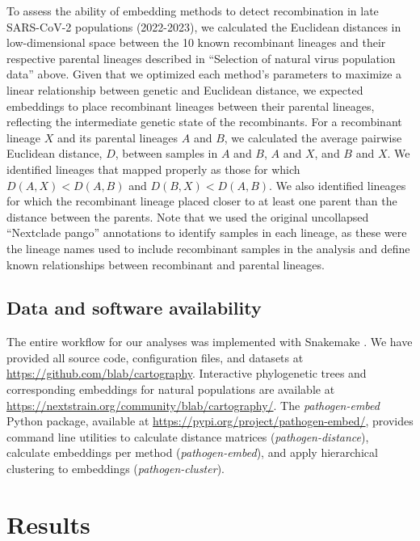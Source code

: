 \documentclass[10pt,letterpaper]{article}
\begin{document}
To assess the ability of embedding methods to detect recombination in late SARS-CoV-2 populations (2022-2023), we calculated the Euclidean distances in low-dimensional space between the 10 known recombinant lineages and their respective parental lineages described in ``Selection of natural virus population data'' above.
Given that we optimized each method's parameters to maximize a linear relationship between genetic and Euclidean distance, we expected embeddings to place recombinant lineages between their parental lineages, reflecting the intermediate genetic state of the recombinants.
For a recombinant lineage $X$ and its parental lineages $A$ and $B$, we calculated the average pairwise Euclidean distance, $D$, between samples in $A$ and $B$, $A$ and $X$, and $B$ and $X$.
We identified lineages that mapped properly as those for which $D(A, X) < D(A, B)$ and $D(B, X) < D(A, B)$.
We also identified lineages for which the recombinant lineage placed closer to at least one parent than the distance between the parents.
Note that we used the original uncollapsed ``Nextclade pango'' annotations to identify samples in each lineage, as these were the lineage names used to include recombinant samples in the analysis and define known relationships between recombinant and parental lineages.

\subsection*{Data and software availability}

The entire workflow for our analyses was implemented with Snakemake \cite{molder_2021}.
We have provided all source code, configuration files, and datasets at \href{https://github.com/blab/cartography}{https://github.com/blab/cartography}.
Interactive phylogenetic trees and corresponding embeddings for natural populations are available at \href{https://nextstrain.org/community/blab/cartography/}{https://nextstrain.org/community/blab/cartography/}.
The \textit{pathogen-embed} Python package, available at \href{https://pypi.org/project/pathogen-embed/}{https://pypi.org/project/pathogen-embed/}, provides command line utilities to calculate distance matrices (\textit{pathogen-distance}), calculate embeddings per method (\textit{pathogen-embed}), and apply hierarchical clustering to embeddings (\textit{pathogen-cluster}).

\section*{Results}
\end{document}
